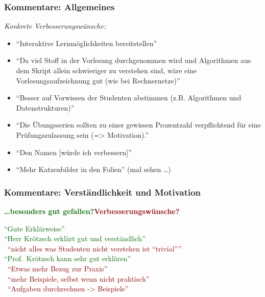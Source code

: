 \documentclass[aspectratio=1610,onlymath]{beamer}
\begin{document}
\maketitle

% 
% 


\newcommand{\praise}[1]{\textcolor{darkgreen}{"`#1"'}}
\newcommand{\critique}[1]{~\hfill\textcolor{darkred}{"`#1"'}}

\begin{frame}\frametitle{Kommentare: Allgemeines}

\bigskip

\emph{Konkrete Verbesserungswünsche:}
\begin{itemize}
\item "`Interaktive Lernmöglichkeiten bereitstellen"'
\item "`Da viel Stoff in der Vorlesung durchgenommen wird und Algorithmen aus dem Skript allein schwieriger zu verstehen sind, wäre eine Vorlesungsaufzeichnung gut (wie bei Rechnernetze)"'
\item "`Besser auf Vorwissen der Studenten abstimmen (z.B. Algorithmen und Datenstrukturen)"'
\item "`Die Übungsserien sollten zu einer gewissen Prozentzahl verpflichtend für eine Prüfungszulassung sein (=> Motivation)."'
\item "`Den Namen [würde ich verbessern]"'
\item "`Mehr Katzenbilder in den Folien"' (mal sehen \ldots)
\end{itemize}

\end{frame}

\begin{frame}\frametitle{Kommentare: Verständlichkeit und Motivation}

\textbf{\textcolor{darkgreen}{\ldots besonders gut gefallen?}}\hfill\textbf{\textcolor{darkred}{Verbesserungswünsche?}}
\bigskip

\praise{Gute Erklärweise}\\[1ex]
\praise{Herr Krötzsch erklärt gut und verständlich}\\[1ex]
\critique{nicht alles was Studenten nicht verstehen ist "`trivial"'}\\[3ex]
\praise{Prof.\ Krötzsch kann sehr gut erklären}\\[1ex]
\critique{Etwas mehr Bezug zur Praxis}\\[1ex]
\critique{mehr Beispiele, selbst wenn nicht praktisch}\\[1ex]
\critique{Aufgaben durchrechnen -> Beispiele}

\end{frame}
\end{document}
